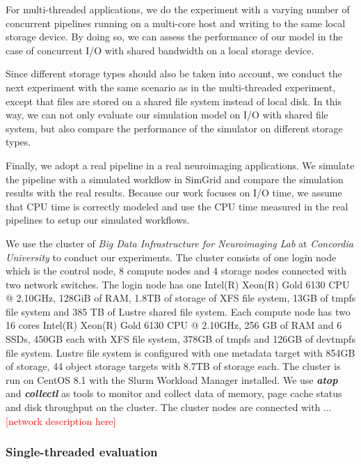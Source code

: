\documentclass[conference]{IEEEtran}
\begin{document}
			For multi-threaded applications, we do the experiment with a varying 
			number of concurrent pipelines running on a multi-core host 
			and writing to the same local storage device. 
		    By doing so, we can assess the performance of our model in the case  
		    of concurrent I/O with shared bandwidth on a local storage device.
		    
		    Since different storage types should also be taken into account, 
		    we conduct the next experiment with the same scenario as 
		    in the multi-threaded experiment, except that files are stored on a 
		    shared file system instead of local disk. 
		    In this way, we can not only evaluate our simulation model on I/O 
		    with shared file system, but also compare the 
		    performance of the simulator on different storage types. 
		    
		    Finally, we adopt a real pipeline in a real neuroimaging applications. 
		    We simulate the pipeline with a simulated workflow in SimGrid 
			and compare the simulation results with the real results. 
			Because our work focuses on I/O time, we assume that CPU time is 
			correctly modeled and use the CPU time measured in the real pipelines 
			to setup our simulated workflows. 
			
			We use the cluster of \textit{Big Data Infrastructure for Neuroimaging Lab} 
			at \textit{Concordia University} to conduct our experiments. The cluster 
			consists of one login node which is the control node, 8 compute nodes 
			and 4 storage nodes connected with two network switches. The login node 
			has one Intel(R) Xeon(R) Gold 6130 CPU @ 2.10GHz, 128GiB of RAM, 1.8TB 
			of storage of XFS file system, 13GB of tmpfs file system and 385 TB of 
			Lustre shared file system. Each compute node has two 16 cores Intel(R) 
			Xeon(R) Gold 6130 CPU @ 2.10GHz, 256 GB of RAM and 6 SSDs, 450GB each 
			with XFS file system, 378GB of tmpfs and 126GB of devtmpfs file system.
			Lustre file system is configured with one metadata target with 854GB 
			of storage, 44 object storage targets with 8.7TB of storage each. 
			The cluster is run on CentOS 8.1 with the Slurm Workload Manager installed. We use 
			\textbf{\textit{atop}} and \textbf{\textit{collectl}} as tools to monitor 
			and collect data of memory, page cache status and disk throughput on 
			the cluster. The cluster nodes are connected with ... 
			\textcolor{red}{[network description here]}
	
			\subsubsection{Single-threaded evaluation}
\end{document}
